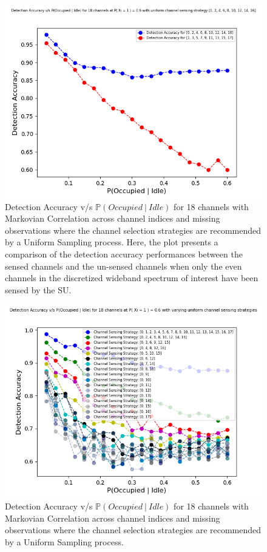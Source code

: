 \documentclass[12pt, draftcls, onecolumn]{IEEEtran}
\begin{document}
\begin{figure}[t]
\includegraphics[width=1.0\textwidth]{Uniform_Channel_Sensing_1.png}
\caption{Detection Accuracy v/s $\mathbb P(Occupied\ |\ Idle)$ for 18 channels with Markovian Correlation across channel indices and missing observations where the channel selection strategies are recommended by a Uniform Sampling process. Here, the plot presents a comparison of the detection accuracy performances between the sensed channels and the un-sensed channels when only the even channels in the discretized wideband spectrum of interest have been sensed by the SU.}
\label{fig:mesh4}
\centering
\end{figure}
\begin{figure}[t]
\includegraphics[width=1.0\textwidth]{Uniform_Channel_Sensing.png}
\caption{Detection Accuracy v/s $\mathbb P(Occupied\ |\ Idle)$ for 18 channels with Markovian Correlation across channel indices and missing observations where the channel selection strategies are recommended by a Uniform Sampling process.}
\label{fig:mesh5}
\centering
\end{figure}
\end{document}
